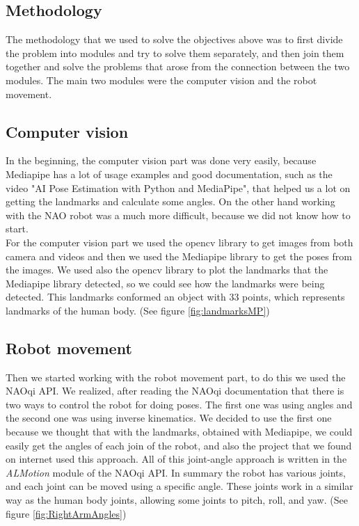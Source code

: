 \documentclass[conference]{IEEEtran}
\begin{document}
\subsection{Methodology}
The methodology that we used to solve the objectives above was to first divide the problem into modules and try to solve them separately, and then join them together and solve the problems that arose from the connection between the two modules.
The main two modules were the computer vision and the robot movement.


\subsection{Computer vision}
In the beginning, the computer vision part was done very easily, because Mediapipe has a lot of usage examples and good documentation, such as the video "AI Pose Estimation with Python and MediaPipe"\cite{b4}, that helped us a lot on getting the landmarks and calculate some angles. On the other hand working with the NAO robot was a much more difficult, because we did not know how to start.
\\
For the computer vision part we used the opencv library to get images from both camera and videos and then we used the Mediapipe library to get the poses from the images.
We used also the opencv library to plot the landmarks that the Mediapipe library detected, so  we could see how the landmarks were being detected. This landmarks conformed an object with 33 points, which represents landmarks of the human body. (See figure \ref{fig:landmarksMP})


\subsection{Robot movement}

Then we started working with the robot movement part, to do this we used the NAOqi API. We realized, after reading the NAOqi documentation that there is two ways to control the robot for doing poses. The first one was using angles and the second one was using inverse kinematics. 
We decided to use the first one because we thought that with the landmarks, obtained with Mediapipe, we could easily get the angles of each join of the robot, and also the project that we found on internet used this approach.
All of this joint-angle approach is written in the \textit{ALMotion} module of the NAOqi API. 
In summary the robot has various joints, and each joint can be moved using a specific angle. These joints work in a similar way as the human body joints, allowing some joints to pitch, roll, and yaw. (See figure \ref{fig:RightArmAngles})
\end{document}
